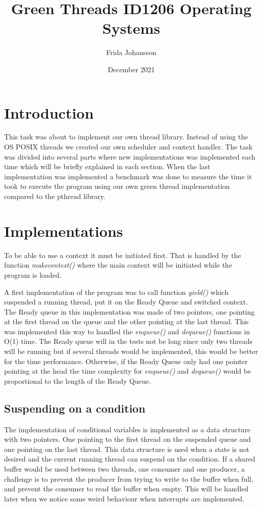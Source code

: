 \documentclass[12pt, letterpaper]{article}
\title{Green Threads ID1206 Operating Systems}
\author{Frida Johansson}
\date{December 2021}
\begin{document}
\maketitle
\section{Introduction}
This task was about to implement our own thread library. Instead of using the OS POSIX threads we
created our own scheduler and context handler. The task was divided into several parts where
new implementations was implemented each time which will be briefly explained in each section.
When the last implementation was implemented a benchmark was done to measure the time it took to 
execute the program using our own green thread implementation compared to the pthread library. 

\section{Implementations}
To be able to use a context it must be initiated first. That is handled by the function 
\emph{makecontext()} where the main context will be initiated while the program is loaded. 

A first implementation of the program was to call function \emph{yield()} which suspended
a running thread, put it on the Ready Queue and switched context. The Ready queue in this implementation 
was made of two pointers, one pointing at the first thread on the queue and the other pointing at the last thread.
This was implemented this way to handled the \emph{enqueue()} and \emph{dequeue()} functions in O(1) time. 
The Ready queue will in the tests not be long since only two threads will be running but
if several threads would be implemented, this would be better for the time performance. Otherwise, if the Ready Queue only had one pointer pointing at the head 
the time complexity for \emph{enqueue()} and \emph{dequeue()} would be proportional to the length of the Ready Queue.

\subsection{Suspending on a condition}

The implementation of conditional variables is implemented as a data structure with two pointers.
One pointing to the first thread on the suspended queue and one pointing on the last thread. This
data structure is used when a state is not desired and the current running thread can suspend on the condition. 
If a shared buffer would be used between two threads, one consumer and one producer, a challenge 
is to prevent the producer from trying to write to the buffer when full, and prevent the consumer to 
read the buffer when empty. This will be handled later when we notice some weird behaviour when interrupts are implemented.
\end{document}
